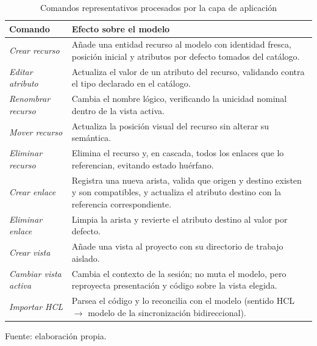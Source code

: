\documentclass{article}
\begin{document}
{        \begin{table}[H]
        \centering
        \small
        \begin{tabular}{p{} p{}}
        \toprule
        \textbf{Comando} & \textbf{Efecto sobre el modelo} \\
        \midrule
        \textit{Crear recurso} & Añade una entidad recurso al modelo con
        identidad fresca, posición inicial y atributos por defecto tomados del
        catálogo. \\
        \addlinespace
        \textit{Editar atributo} & Actualiza el valor de un atributo del
        recurso, validando contra el tipo declarado en el catálogo. \\
        \addlinespace
        \textit{Renombrar recurso} & Cambia el nombre lógico, verificando la
        unicidad nominal dentro de la vista activa. \\
        \addlinespace
        \textit{Mover recurso} & Actualiza la posición visual del recurso sin
        alterar su semántica. \\
        \addlinespace
        \textit{Eliminar recurso} & Elimina el recurso y, en cascada, todos los
        enlaces que lo referencian, evitando estado huérfano. \\
        \addlinespace
        \textit{Crear enlace} & Registra una nueva arista, valida que origen y
        destino existen y son compatibles, y actualiza el atributo destino con
        la referencia correspondiente. \\
        \addlinespace
        \textit{Eliminar enlace} & Limpia la arista y revierte el atributo
        destino al valor por defecto. \\
        \addlinespace
        \textit{Crear vista} & Añade una vista al proyecto con su directorio de
        trabajo aislado. \\
        \addlinespace
        \textit{Cambiar vista activa} & Cambia el contexto de la sesión; no
        muta el modelo, pero reproyecta presentación y código sobre la vista
        elegida. \\
        \addlinespace
        \textit{Importar HCL} & Parsea el código y lo reconcilia con el modelo
        (sentido HCL $\rightarrow$ modelo de la sincronización bidireccional). \\
        \bottomrule
        \end{tabular}
        \caption{Comandos representativos procesados por la capa de aplicación}
        \label{tab:comandos_aplicacion}
        \footnotesize Fuente: elaboración propia.
        \end{table}


}
\end{document}
